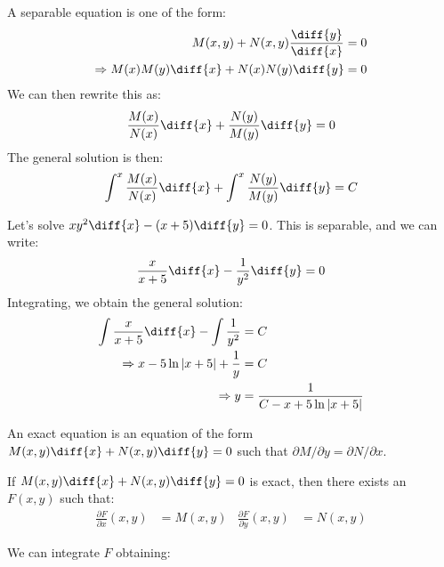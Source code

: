         A separable equation is one of the form:
        \begin{align*}
            M(x,y)+N(x,y)\frac{\diff{y}}{\diff{x}}&=0\\
            \Rightarrow{M(x)M(y)\diff{x}}
            +N(x)N(y)\diff{y}&=0
        \end{align*}
        We can then rewrite this as:
        \begin{equation*}
            \frac{M(x)}{N(x)}\diff{x}+\frac{N(y)}{M(y)}\diff{y}=0
        \end{equation*}
        The general solution is then:
        \begin{equation*}
            \int^{x}\frac{M(x)}{N(x)}\diff{x}+
            \int^{x}\frac{N(y)}{M(y)}\diff{y}=C
        \end{equation*}
        \begin{example}
            Let's solve $xy^{2}\diff{x}-(x+5)\diff{y}=0$.
            This is separable, and we can write:
            \begin{equation*}
                \frac{x}{x+5}\diff{x}-\frac{1}{y^{2}}\diff{y}=0
            \end{equation*}
            Integrating, we obtain the general solution:
            \begin{align*}
                \int\frac{x}{x+5}\diff{x}-\int\frac{1}{y^{2}}
                &=C\\
                \Rightarrow
                x-5\ln|x+5|+\frac{1}{y}&=C\\
                \Rightarrow
                y&=\frac{1}{C-x+5\ln|x+5|}
            \end{align*}
        \end{example}
        \begin{definition}
            An exact equation is an equation of the form
            $M(x,y)\diff{x}+N(x,y)\diff{y}=0$ such that
            $\partial{M}/\partial{y}=\partial{N}/\partial{x}$.
        \end{definition}
        \begin{theorem}
            If $M(x,y)\diff{x}+N(x,y)\diff{y}=0$ is exact,
            then there exists an $F(x,y)$ such that:
            \begin{align*}
                \frac{\partial{F}}{\partial{x}}(x,y)&=M(x,y)
                &
                \frac{\partial{F}}{\partial{y}}(x,y)&=N(x,y)
            \end{align*}
        \end{theorem}
        We can integrate $F$ obtaining:
